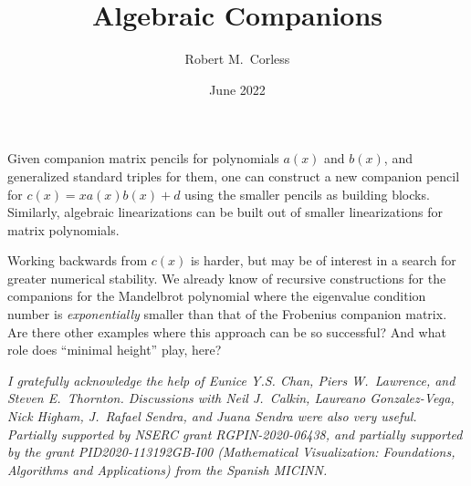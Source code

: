 \documentclass[a4paper]{amsart}
\date{June 2022}
\begin{document}
\title{Algebraic Companions}
\author{Robert M.~Corless} %
\address{University of Western Ontario} %

\maketitle

Given companion matrix pencils for polynomials $a(x)$ and $b(x)$, and generalized standard triples for them, one can construct a new companion pencil for $c(x) = xa(x)b(x)+d$ using the smaller pencils as building blocks.  Similarly, algebraic linearizations can be built out of smaller linearizations for matrix polynomials.

Working backwards from $c(x)$ is harder, but may be of interest in a search for greater numerical stability.  We already know of recursive constructions for the companions for the Mandelbrot polynomial where the eigenvalue condition number is \textsl{exponentially} smaller than that of the Frobenius companion matrix.  Are there other examples where this approach can be so successful?  And what role does ``minimal height'' play, here?

\textsl{I gratefully acknowledge the help of Eunice Y.S. Chan, Piers W.~Lawrence, and Steven E.~Thornton.  Discussions with Neil J.~Calkin, Laureano Gonzalez-Vega, Nick Higham, J.~Rafael Sendra, and Juana Sendra were also very useful.  Partially supported by NSERC grant RGPIN-2020-06438, and
partially supported by the grant PID2020-113192GB-I00 (Mathematical Visualization: Foundations, Algorithms and Applications) from the Spanish MICINN. }
\end{document}

